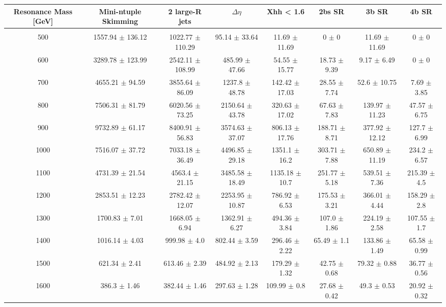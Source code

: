 \begin{footnotesize} 
\begin{tabular}{c|c|c|c|c|c|c|c} 
Resonance Mass [GeV] & Mini-ntuple Skimming & 2 large-R jets & $\Delta\eta$ & Xhh < 1.6 & 2bs SR & 3b SR & 4b SR \\ 
\hline\hline 
& & & & & & &\\ 
500 & 1557.94 $\pm$ 136.12 & 1022.77 $\pm$ 110.29 & 95.14 $\pm$ 33.64 & 11.69 $\pm$ 11.69 & 0 $\pm$ 0 & 11.69 $\pm$ 11.69 & 0 $\pm$ 0\\ 
600 & 3289.78 $\pm$ 123.99 & 2542.11 $\pm$ 108.99 & 485.99 $\pm$ 47.66 & 54.55 $\pm$ 15.77 & 18.73 $\pm$ 9.39 & 9.17 $\pm$ 6.49 & 0 $\pm$ 0\\ 
700 & 4655.21 $\pm$ 94.59 & 3855.64 $\pm$ 86.09 & 1237.8 $\pm$ 48.78 & 142.42 $\pm$ 17.03 & 28.55 $\pm$ 7.74 & 52.6 $\pm$ 10.75 & 7.69 $\pm$ 3.85\\ 
800 & 7506.31 $\pm$ 81.79 & 6020.56 $\pm$ 73.25 & 2150.64 $\pm$ 43.78 & 320.63 $\pm$ 17.02 & 67.63 $\pm$ 7.83 & 139.97 $\pm$ 11.23 & 47.57 $\pm$ 6.75\\ 
900 & 9732.89 $\pm$ 61.17 & 8400.91 $\pm$ 56.83 & 3574.63 $\pm$ 37.07 & 806.13 $\pm$ 17.76 & 188.71 $\pm$ 8.71 & 377.92 $\pm$ 12.12 & 127.7 $\pm$ 6.99\\ 
1000 & 7516.07 $\pm$ 37.72 & 7033.18 $\pm$ 36.49 & 4496.85 $\pm$ 29.18 & 1351.1 $\pm$ 16.2 & 303.71 $\pm$ 7.88 & 650.89 $\pm$ 11.19 & 234.2 $\pm$ 6.57\\ 
1100 & 4731.39 $\pm$ 21.54 & 4563.4 $\pm$ 21.15 & 3485.58 $\pm$ 18.49 & 1135.18 $\pm$ 10.7 & 251.77 $\pm$ 5.18 & 539.51 $\pm$ 7.36 & 215.39 $\pm$ 4.5\\ 
1200 & 2853.51 $\pm$ 12.23 & 2782.42 $\pm$ 12.07 & 2253.95 $\pm$ 10.87 & 786.92 $\pm$ 6.53 & 175.53 $\pm$ 3.21 & 366.01 $\pm$ 4.44 & 158.29 $\pm$ 2.8\\ 
1300 & 1700.83 $\pm$ 7.01 & 1668.05 $\pm$ 6.94 & 1362.91 $\pm$ 6.27 & 494.36 $\pm$ 3.84 & 107.0 $\pm$ 1.86 & 224.19 $\pm$ 2.58 & 107.55 $\pm$ 1.7\\ 
1400 & 1016.14 $\pm$ 4.03 & 999.98 $\pm$ 4.0 & 802.44 $\pm$ 3.59 & 296.46 $\pm$ 2.22 & 65.49 $\pm$ 1.1 & 133.86 $\pm$ 1.49 & 65.58 $\pm$ 0.99\\ 
1500 & 621.34 $\pm$ 2.41 & 613.46 $\pm$ 2.39 & 484.92 $\pm$ 2.13 & 179.29 $\pm$ 1.32 & 42.75 $\pm$ 0.68 & 79.32 $\pm$ 0.88 & 36.77 $\pm$ 0.56\\ 
1600 & 386.3 $\pm$ 1.46 & 382.44 $\pm$ 1.46 & 297.63 $\pm$ 1.28 & 109.99 $\pm$ 0.8 & 27.68 $\pm$ 0.42 & 49.3 $\pm$ 0.53 & 20.92 $\pm$ 0.32\\ 

\end{tabular}
\end{footnotesize}

